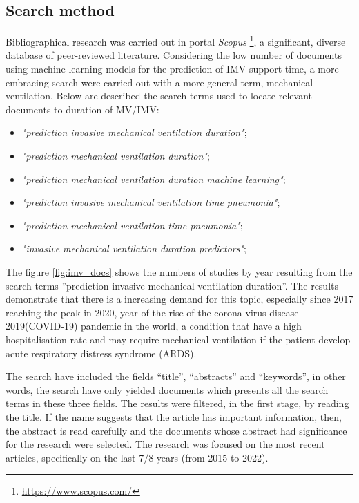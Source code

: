 \documentclass[journal]{IEEEtran} %
\begin{document}
\subsection{Search method}

Bibliographical research was carried out in portal \emph{Scopus} \footnote{\url{https://www.scopus.com/}}, a significant, diverse database of peer-reviewed literature.
Considering the low number of documents using machine learning
models for the prediction of IMV support time, a more embracing search were carried out with a more general term, mechanical ventilation.
Below are described the search terms used to locate relevant documents to duration of MV/IMV:

\begin{itemize}
    \item \emph{"prediction invasive mechanical ventilation duration"};
    \item \emph{"prediction mechanical ventilation duration"};
    \item \emph{"prediction mechanical ventilation duration machine learning"};
    \item \emph{"prediction invasive mechanical ventilation time pneumonia"};
    \item \emph{"prediction mechanical ventilation time pneumonia"};
    \item \emph{"invasive mechanical ventilation duration predictors"};
\end{itemize}

The figure \ref{fig:imv_docs} shows the numbers of studies by year resulting from the search terms ”prediction invasive mechanical ventilation duration”. The results demonstrate that there is a increasing demand for this topic, especially since 2017 reaching the peak in 2020, year of the rise of the corona virus disease 2019(COVID-19) pandemic in the world, a condition that have a high hospitalisation rate\cite{Nguyen2020} and may require mechanical ventilation if the patient develop acute respiratory distress syndrome (ARDS)\cite{Nakayama2022}. 

The search have included the fields “title”, “abstracts” and “keywords”, in other words, the search have only yielded documents which presents all the search terms in these three fields. The results were filtered, in the first stage, by reading the title. If the name suggests that the article has important information, then, the abstract is read carefully and the documents whose abstract had significance for the research were selected. The research was focused on the most recent articles, specifically on the last 7/8 years (from 2015 to 2022).
\end{document}
